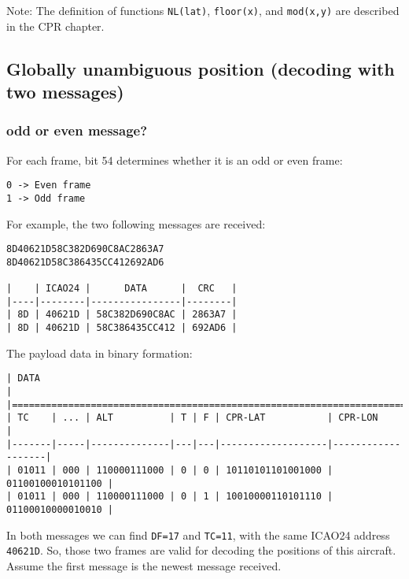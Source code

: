 Note: The definition of functions \texttt{NL(lat)}, \texttt{floor(x)}, and \texttt{mod(x,y)} are described in the CPR chapter.

\subsection{Globally unambiguous position (decoding with two messages)}\label{globally-unambiguous-position-decoding-with-two-messages}

\subsubsection{odd or even message?}\label{odd-or-even-message}

For each frame, bit 54 determines whether it is an odd or even frame:

\begin{verbatim}
0 -> Even frame
1 -> Odd frame
\end{verbatim}

For example, the two following messages are received:

\begin{verbatim}
8D40621D58C382D690C8AC2863A7
8D40621D58C386435CC412692AD6

|    | ICAO24 |      DATA      |  CRC   |
|----|--------|----------------|--------|
| 8D | 40621D | 58C382D690C8AC | 2863A7 |
| 8D | 40621D | 58C386435CC412 | 692AD6 |

\end{verbatim}

The payload data in binary formation:

\begin{verbatim}
| DATA                                                                       |
|============================================================================|
| TC    | ... | ALT          | T | F | CPR-LAT           | CPR-LON           |
|-------|-----|--------------|---|---|-------------------|-------------------|
| 01011 | 000 | 110000111000 | 0 | 0 | 10110101101001000 | 01100100010101100 |
| 01011 | 000 | 110000111000 | 0 | 1 | 10010000110101110 | 01100010000010010 |
\end{verbatim}

In both messages we can find \texttt{DF=17} and \texttt{TC=11}, with the same ICAO24 address \texttt{40621D}. So, those two frames are valid for decoding the positions of this aircraft. Assume the first message is the newest message received.

